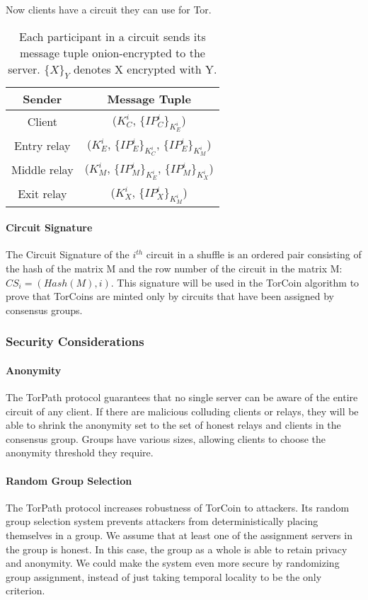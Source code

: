 Now clients have a circuit they can use for Tor.

{\renewcommand{\arraystretch}{2}
\begin{table}[h]
\centering
  \begin{tabular}{ |c || c| }
  \hline
  \textbf{Sender} & \textbf{Message Tuple} \\ \hline
  Client & ($K^{i}_{C}$, $\{IP^{i}_{C}\}_{K^{i}_{E}}$) \\ \hline
  Entry relay & ($K^{i}_{E}$, $\{IP^{i}_{E}\}_{K^{i}_{C}}$, $\{IP^{i}_{E}\}_{K^{i}_{M}}$) \\ \hline
  Middle relay & ($K^{i}_{M}$, $\{IP^{i}_{M}\}_{K^{i}_{E}}$, $\{IP^{i}_{M}\}_{K^{i}_{X}}$) \\ \hline
  Exit relay & ($K^{i}_{X}$, $\{IP^{i}_{X}\}_{K^{i}_{M}}$) \\ \hline
  \end{tabular}
  \caption{Each participant in a circuit sends its message 
  tuple onion-encrypted to the server. $\{X\}_{Y}$ denotes X encrypted with Y.}
  \label{table:message_format}
\end{table}

\paragraph{Circuit Signature} The Circuit Signature of the $i^{th}$ circuit in
a shuffle is an ordered pair consisting of the hash of the matrix M and the
row number of the circuit in the matrix M: $CS_i = (Hash(M), i)$. This
signature will be used in the TorCoin algorithm to prove that TorCoins are
minted only by circuits that have been assigned by consensus groups.

\subsubsection{Security Considerations} 

\paragraph{Anonymity} The TorPath protocol guarantees that no single
server can be aware of the entire circuit of any client. If there are malicious
colluding clients or relays, they will be able to shrink the anonymity set to
the set of honest relays and clients in the consensus group.  Groups have
various sizes, allowing clients to choose the anonymity threshold they
require.

\paragraph{Random Group Selection} The TorPath protocol increases
robustness of TorCoin to attackers. Its random group selection system prevents
attackers from deterministically placing themselves in a group. We assume that
at least one of the assignment servers in the group is honest. In this case,
the group as a whole is able to retain privacy and anonymity. We could make
the system even more secure by randomizing group assignment, instead of just
taking temporal locality to be the only criterion.

}
